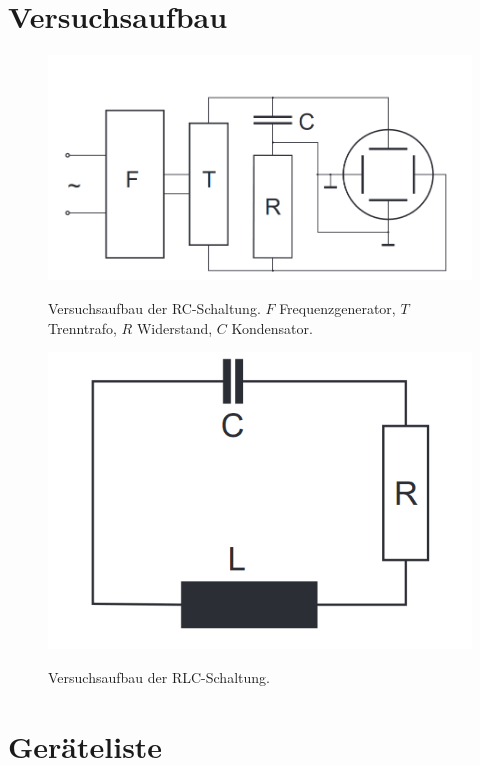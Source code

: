 \documentclass{article}
\begin{document}
\section{Versuchsaufbau}

\begin{figure}[H]
\caption{Versuchsaufbau der RC-Schaltung. $F$ Frequenzgenerator, $T$ Trenntrafo, $R$ Widerstand, $C$ Kondensator.}
\label{fig:schaltung1}
{\centering
\includegraphics[scale=0.4]{basics1.png}}
\end{figure}

\begin{figure}[H]
\caption{Versuchsaufbau der RLC-Schaltung.}
\label{fig:schaltung2}
{\centering
\includegraphics[scale=0.4]{basics2.png}}
\end{figure}


\section{Geräteliste}
\end{document}

